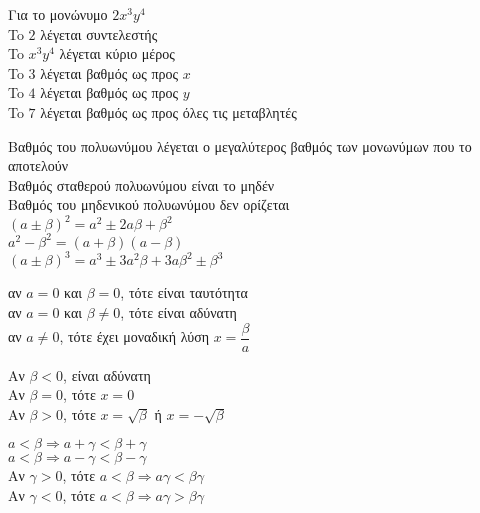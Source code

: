 \documentclass[a4paper,landscape,10pt]{article}
\begin{document}
\begin{multicols}{3}
Για το μονώνυμο $2x^3y^4$ \\
\mybullet To $2$ λέγεται συντελεστής \\
\mybullet To $x^3y^4$ λέγεται κύριο μέρος \\
\mybullet To $3$ λέγεται βαθμός ως προς $x$ \\
\mybullet To $4$ λέγεται βαθμός ως προς $y$ \\
\mybullet To $7$ λέγεται βαθμός ως προς όλες τις μεταβλητές


\mybullet Βαθμός του πολυωνύμου λέγεται ο μεγαλύτερος βαθμός 
των μονωνύμων που το αποτελούν \\
\mybullet Βαθμός σταθερού πολυωνύμου είναι το μηδέν \\
\mybullet Βαθμός του μηδενικού πολυωνύμου δεν ορίζεται \\


\mybullet $(a\pm\beta)^2=a^2\pm2a\beta+\beta^2$ \\
\mybullet $a^2-\beta^2=(a+\beta)(a-\beta)$ \\
\mybullet $(a\pm\beta)^3=a^3\pm3a^2\beta+3a\beta^2\pm\beta^3$ %

\mybullet αν $a=0$ και $\beta=0$, τότε είναι ταυτότητα \\
\mybullet αν $a=0$ και $\beta\ne0$, τότε είναι αδύνατη \\
\mybullet αν $a\ne0$, τότε έχει μοναδική λύση $x=\dfrac{\beta}{a}$ 

\mybullet Αν $\beta<0$, είναι αδύνατη \\
\mybullet Αν $\beta=0$, τότε $x=0$ \\
\mybullet Αν $\beta>0$, τότε $x=\sqrt{\beta}$ ή $x=-\sqrt{\beta}$ 

\mybullet $a<\beta\Rightarrow a+\gamma<\beta+\gamma$ \\
\mybullet $a<\beta\Rightarrow a-\gamma<\beta-\gamma$ \\
\mybullet Αν $\gamma>0$, τότε $a<\beta\Rightarrow a\gamma<\beta\gamma$ \\
\mybullet Αν $\gamma<0$, τότε $a<\beta\Rightarrow a\gamma>\beta\gamma$ \\


\end{multicols}
\end{document}
